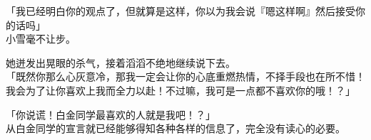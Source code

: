「我已经明白你的观点了，但就算是这样，你以为我会说『嗯这样啊』然后接受你的话吗」\\

小雪毫不让步。

她迸发出晃眼的杀气，接着滔滔不绝地继续说下去。\\

「既然你那么心灰意冷，那我一定会让你的心底重燃热情，不择手段也在所不惜！我会为了让你喜欢上我而全力以赴！不过嘛，我可是一点都不喜欢你的哦！？」

「你说谎！白金同学最喜欢的人就是我吧！？」\\

从白金同学的宣言就已经能够得知各种各样的信息了，完全没有读心的必要。
